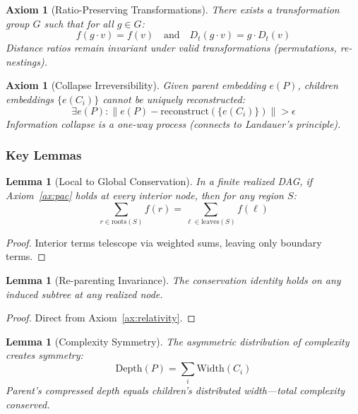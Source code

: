 \documentclass[11pt,a4paper]{article}
\newtheorem{lemma}[theorem]{Lemma}
\newtheorem{axiom}[theorem]{Axiom}
\newcommand{\norm}[1]{\|#1\|}
\begin{document}
\begin{axiom}[Ratio-Preserving Transformations]
\label{ax:symmetry}
There exists a transformation group $G$ such that for all $g \in G$:
\begin{equation}
f(g \cdot v) = f(v) \quad \text{and} \quad D_t(g \cdot v) = g \cdot D_t(v)
\end{equation}
Distance ratios remain invariant under valid transformations (permutations, re-nestings).
\end{axiom}

\begin{axiom}[Collapse Irreversibility]
\label{ax:irreversibility}
Given parent embedding $e(P)$, children embeddings $\{e(C_i)\}$ cannot be uniquely reconstructed:
\begin{equation}
\exists e(P) : \norm{e(P) - \text{reconstruct}(\{e(C_i)\})} > \epsilon
\end{equation}
Information collapse is a one-way process (connects to Landauer's principle).
\end{axiom}

\subsubsection{Key Lemmas}

\begin{lemma}[Local to Global Conservation]
\label{lem:global}
In a finite realized DAG, if Axiom~\ref{ax:pac} holds at every interior node, then for any region $S$:
\begin{equation}
\sum_{r \in \text{roots}(S)} f(r) = \sum_{\ell \in \text{leaves}(S)} f(\ell)
\end{equation}
\end{lemma}

\begin{proof}
Interior terms telescope via weighted sums, leaving only boundary terms.
\end{proof}

\begin{lemma}[Re-parenting Invariance]
\label{lem:reparent}
The conservation identity holds on any induced subtree at any realized node.
\end{lemma}

\begin{proof}
Direct from Axiom~\ref{ax:relativity}.
\end{proof}

\begin{lemma}[Complexity Symmetry]
\label{lem:complexity}
The asymmetric distribution of complexity creates symmetry:
\begin{equation}
\text{Depth}(P) = \sum_i \text{Width}(C_i)
\end{equation}
Parent's compressed depth equals children's distributed width---total complexity conserved.
\end{lemma}
\end{document}
